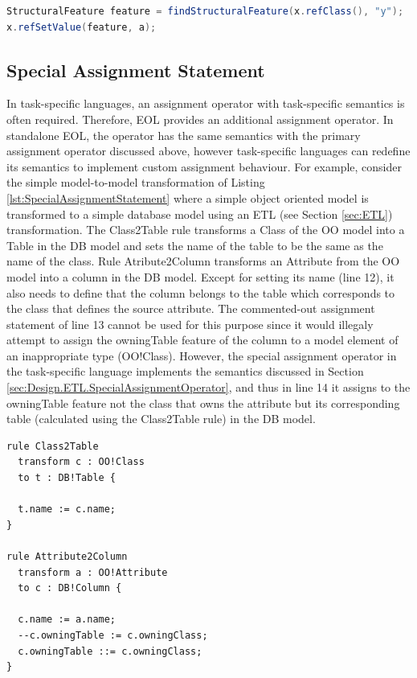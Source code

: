 \begin{lstlisting}[basicstyle=\ttfamily\footnotesize, flexiblecolumns=true, numbers=none, nolol=true, caption=Java code that assigns the value of a property of a model element that belongs to an MDR-based model, label=lst:MdrModelElementPropertyAssignment, numbers=left, language=Java, tabsize=2]
StructuralFeature feature = findStructuralFeature(x.refClass(), "y");
x.refSetValue(feature, a);
\end{lstlisting}

\subsection{Special Assignment Statement}
\label{sec:Design.EOL.SpecialAssignmentStatement}
In task-specific languages, an assignment operator with task-specific semantics is often required. Therefore, EOL provides an additional assignment operator. In standalone EOL, the operator has the same semantics with the primary assignment operator discussed above, however task-specific languages can redefine its semantics to implement custom
assignment behaviour. For example, consider the simple model-to-model transformation of Listing \ref{lst:SpecialAssignmentStatement} where a simple object oriented model is transformed to a simple database model using an ETL (see Section \ref{sec:ETL}) transformation. The Class2Table rule transforms a Class of the OO model into
a Table in the DB model and sets the name of the table to be the same as the name of the class. Rule Atribute2Column transforms an Attribute from the OO model into a column in the DB model. Except for setting its name (line 12), it also needs to define that the column belongs to the table which corresponds to the class that defines the source attribute. The commented-out assignment statement of line 13 cannot
be used for this purpose since it would illegaly attempt to assign the owningTable feature of the column to a model element of an inappropriate type (OO!Class). However, the special assignment operator in the task-specific language implements the semantics discussed in Section \ref{sec:Design.ETL.SpecialAssignmentOperator}, and thus in line 14 it assigns to the owningTable feature not the class that owns the attribute but its corresponding table (calculated using the Class2Table rule) in the DB model. 

\begin{lstlisting}[basicstyle=\ttfamily\footnotesize, flexiblecolumns=true, numbers=none, nolol=true, caption=A simple model-to-model transformation
demonstrating the special assignment statement, label=lst:SpecialAssignmentStatement, numbers=left, language=ETL, tabsize=2]
rule Class2Table
  transform c : OO!Class
  to t : DB!Table {
  
  t.name := c.name;
}

rule Attribute2Column
  transform a : OO!Attribute
  to c : DB!Column {
  
  c.name := a.name;
  --c.owningTable := c.owningClass;
  c.owningTable ::= c.owningClass;
}

\end{lstlisting}


